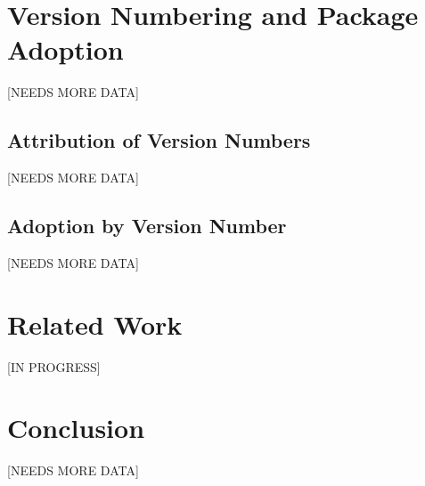 \documentclass[10pt,conference]{IEEEtran}
\begin{document}
\section{Version Numbering and Package Adoption}
[NEEDS MORE DATA]

\subsection{Attribution of Version Numbers}
[NEEDS MORE DATA]

\subsection{Adoption by Version Number}
[NEEDS MORE DATA]

\section{Related Work}
[IN PROGRESS]


\section{Conclusion}
[NEEDS MORE DATA]
\end{document}
